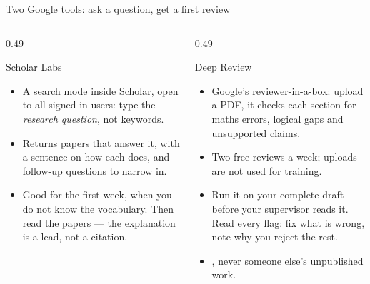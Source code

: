 \documentclass[aspectratio=169,11pt]{beamer}
\begin{document}
\begin{frame}{Two Google tools: ask a question, get a first review}
\begin{columns}[T]
\begin{column}{0.49\textwidth}
\begin{block}{Scholar Labs \quad\footnotesize{}}
\footnotesize
\begin{itemize}
  \item A search mode inside Scholar, open to all signed-in users: type the
        \emph{research question}, not keywords.
  \item Returns papers that answer it, with a sentence on how each does, and
        follow-up questions to narrow in.
  \item Good for the first week, when you do not know the vocabulary. Then
        read the papers --- the explanation is a lead, not a citation.
\end{itemize}
\end{block}
\end{column}
\begin{column}{0.49\textwidth}
\begin{block}{Deep Review \quad\footnotesize{}}
\footnotesize
\begin{itemize}
  \item Google's reviewer-in-a-box: upload a PDF, it checks each section for
        maths errors, logical gaps and unsupported claims.
  \item Two free reviews a week; uploads are not used for training.
  \item Run it on your complete draft before your supervisor reads it. Read
        every flag: fix what is wrong, note why you reject the rest.
  \item {}, never someone else's unpublished work.
\end{itemize}
\end{block}
\end{column}
\end{columns}
\end{frame}
\end{document}

